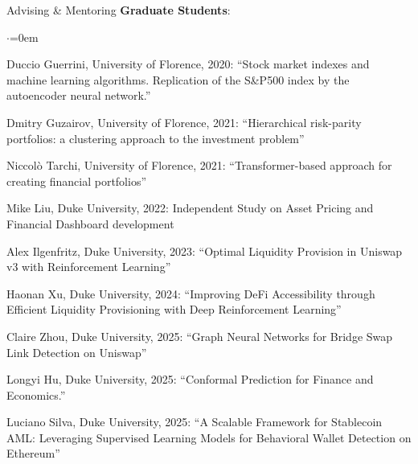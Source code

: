 \documentclass{resume} %
\begin{document}
\begin{rSection}{Advising \& Mentoring}
\textbf{Graduate Students}:
\begin{list}{$\cdot$}{\leftmargin=0em}
\item Duccio Guerrini, University of Florence, 2020: ``Stock market indexes and machine learning algorithms. Replication of the S\&P500 index by the autoencoder neural network.''
\item Dmitry Guzairov, University of Florence, 2021: ``Hierarchical risk-parity portfolios: a clustering approach to the investment problem''
\item Niccolò Tarchi, University of Florence, 2021: ``Transformer-based approach for creating financial portfolios''
\item Mike Liu, Duke University, 2022: Independent Study on Asset Pricing and Financial Dashboard development
\item Alex Ilgenfritz, Duke University, 2023: ``Optimal Liquidity Provision in Uniswap v3 with Reinforcement Learning''
\item Haonan Xu, Duke University, 2024: ``Improving DeFi Accessibility through Efficient Liquidity Provisioning with Deep Reinforcement Learning''
\item Claire Zhou, Duke University, 2025: ``Graph Neural Networks for Bridge Swap Link Detection on Uniswap''
\item Longyi Hu, Duke University, 2025: ``Conformal Prediction for Finance and Economics.''
\item Luciano Silva, Duke University, 2025: ``A Scalable Framework for Stablecoin AML: Leveraging Supervised Learning Models for Behavioral Wallet Detection on Ethereum''
\end{list}
\end{rSection}
\end{document}
